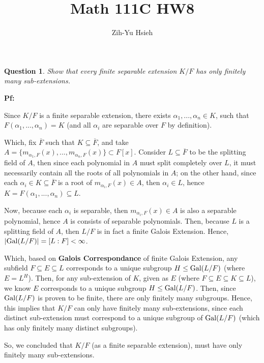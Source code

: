 \documentclass{article}
\title{Math 111C HW8}
\author{Zih-Yu Hsieh}
\newtheorem{question}{Question}
\newcommand{\Gal}{\textmd{Gal}}
\begin{document}
\maketitle

\section{}%
\begin{question}\label{q1}
    Show that every finite separable extension $K/F$ has only finitely many sub-extensions.
\end{question}

\textbf{Pf:}

Since $K/F$ is a finite separable extension, there exists $\alpha_1,...,\alpha_n\in K$, such that $F(\alpha_1,...,\alpha_n)=K$ (and all $\alpha_i$ are separable over $F$ by definition).

Which, fix $\overline{F}$ such that $K\subseteq\overline{F}$, and take $A=\{m_{\alpha_1,F}(x),...,m_{\alpha_n,F}(x)\}\subset F[x]$. Consider $L\subseteq\overline{F}$ to be the splitting field of $A$, then since each polynomial in $A$ must split completely over $L$, it must necessarily contain all the roots of all polynomials in $A$; on the other hand, since each $\alpha_i\in K\subseteq \overline{F}$ is a root of $m_{\alpha_i,F}(x)\in A$, then $\alpha_i\in L$, hence $K=F(\alpha_1,...,\alpha_n)\subseteq L$.

Now, because each $\alpha_i$ is separable, then $m_{\alpha_i,F}(x)\in A$ is also a separable polynomial, hence $A$ is consists of separable polynomials. Then, because $L$ is a splitting field of $A$, then $L/F$ is in fact a finite Galois Extension. Hence, $|\Gal(L/F)| = [L:F]<\infty$.

Which, based on \textbf{Galois Correspondance} of finite Galois Extension, any subfield $F\subseteq E\subseteq L$ corresponds to a unique subgroup $H\leq \Gal(L/F)$ (where $E=L^H$). Then, for any sub-extension of $K$, given as $E$ (where $F\subseteq E\subseteq K\subseteq L$), we know $E$ corresponds to a unique subgroup $H\leq \Gal(L/F)$.
Then, since $\Gal(L/F)$ is proven to be finite, there are only finitely many subgroups. Hence, this implies that $K/F$ can only have finitely many sub-extensions, since each distinct sub-extension must correspond to a unique subgroup of $\Gal(L/F)$ (which has only finitely many distinct subgroups).

So, we concluded that $K/F$ (as a finite separable extension), must have only finitely many sub-extensions.
\end{document}
